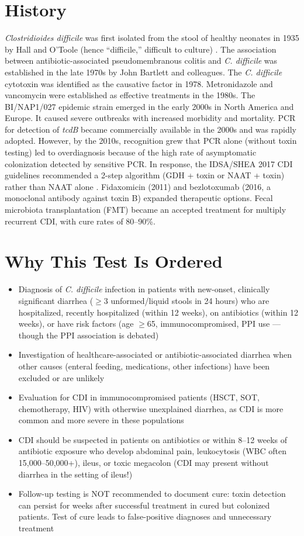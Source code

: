 \section*{History}
\textit{Clostridioides difficile} was first isolated from the stool of healthy neonates in 1935 by Hall and O'Toole (hence ``difficile,'' difficult to culture) \cite{hall1935intestinal}. The association between antibiotic-associated pseudomembranous colitis and \textit{C. difficile} was established in the late 1970s by John Bartlett and colleagues. The \textit{C. difficile} cytotoxin was identified as the causative factor in 1978. Metronidazole and vancomycin were established as effective treatments in the 1980s. The BI/NAP1/027 epidemic strain emerged in the early 2000s in North America and Europe. It caused severe outbreaks with increased morbidity and mortality. PCR for detection of \textit{tcdB} became commercially available in the 2000s and was rapidly adopted. However, by the 2010s, recognition grew that PCR alone (without toxin testing) led to overdiagnosis because of the high rate of asymptomatic colonization detected by sensitive PCR. In response, the IDSA/SHEA 2017 CDI guidelines recommended a 2-step algorithm (GDH + toxin or NAAT + toxin) rather than NAAT alone \cite{mcdonald2018clinical}. Fidaxomicin (2011) and bezlotoxumab (2016, a monoclonal antibody against toxin B) expanded therapeutic options. Fecal microbiota transplantation (FMT) became an accepted treatment for multiply recurrent CDI, with cure rates of 80--90\%.

\section*{Why This Test Is Ordered}
\begin{itemize}
  \item Diagnosis of \textit{C. difficile} infection in patients with new-onset, clinically significant diarrhea ($\geq$3 unformed/liquid stools in 24 hours) who are hospitalized, recently hospitalized (within 12 weeks), on antibiotics (within 12 weeks), or have risk factors (age $\geq$65, immunocompromised, PPI use --- though the PPI association is debated)
  \item Investigation of healthcare-associated or antibiotic-associated diarrhea when other causes (enteral feeding, medications, other infections) have been excluded or are unlikely
  \item Evaluation for CDI in immunocompromised patients (HSCT, SOT, chemotherapy, HIV) with otherwise unexplained diarrhea, as CDI is more common and more severe in these populations
  \item CDI should be suspected in patients on antibiotics or within 8--12 weeks of antibiotic exposure who develop abdominal pain, leukocytosis (WBC often 15,000--50,000+), ileus, or toxic megacolon (CDI may present without diarrhea in the setting of ileus!)
  \item Follow-up testing is NOT recommended to document cure: toxin detection can persist for weeks after successful treatment in cured but colonized patients. Test of cure leads to false-positive diagnoses and unnecessary treatment
\end{itemize}

